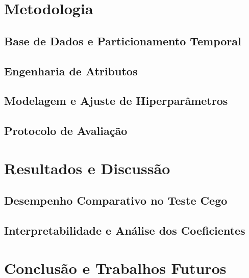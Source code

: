 \documentclass[conference]{IEEEtran}
\begin{document}
\newpage
\section{Metodologia}

\subsection{Base de Dados e Particionamento Temporal}

\subsection{Engenharia de Atributos}

\subsection{Modelagem e Ajuste de Hiperparâmetros}

\subsection{Protocolo de Avaliação}

\section{Resultados e Discussão}

\subsection{Desempenho Comparativo no Teste Cego}

\subsection{Interpretabilidade e Análise dos Coeficientes}

\section{Conclusão e Trabalhos Futuros}
\end{document}

